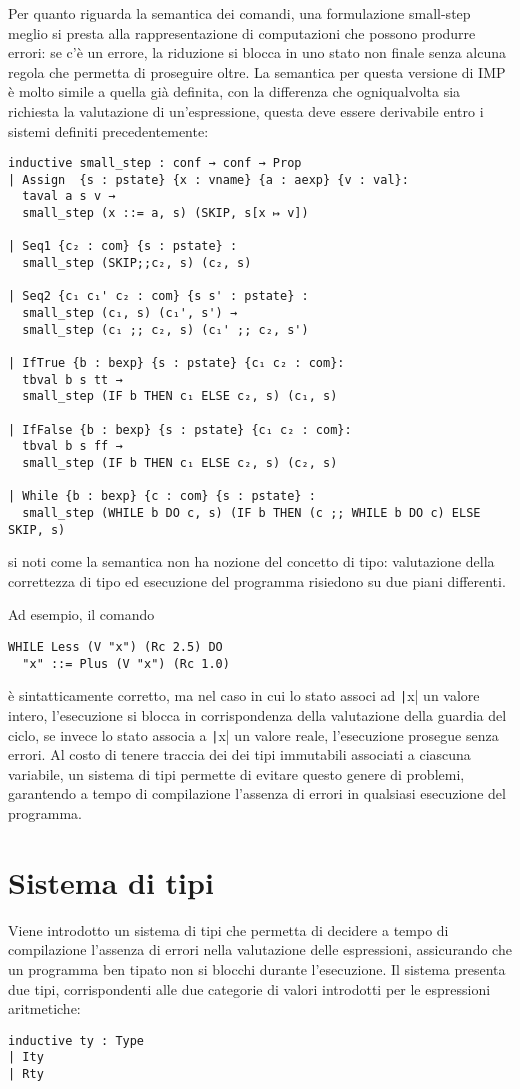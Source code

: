 Per quanto riguarda la semantica dei comandi, una formulazione small-step meglio si presta alla rappresentazione di computazioni che possono produrre errori: se c'è un errore, la riduzione si blocca in uno stato non finale senza alcuna regola che permetta di proseguire oltre. La semantica per questa versione di IMP è molto simile a quella già definita, con la differenza che ogniqualvolta sia richiesta la valutazione di un'espressione, questa deve essere derivabile entro i sistemi definiti precedentemente:
\begin{verbatim}
inductive small_step : conf → conf → Prop
| Assign  {s : pstate} {x : vname} {a : aexp} {v : val}:
  taval a s v →
  small_step (x ::= a, s) (SKIP, s[x ↦ v])

| Seq1 {c₂ : com} {s : pstate} :
  small_step (SKIP;;c₂, s) (c₂, s)

| Seq2 {c₁ c₁' c₂ : com} {s s' : pstate} :
  small_step (c₁, s) (c₁', s') →
  small_step (c₁ ;; c₂, s) (c₁' ;; c₂, s')

| IfTrue {b : bexp} {s : pstate} {c₁ c₂ : com}:
  tbval b s tt →
  small_step (IF b THEN c₁ ELSE c₂, s) (c₁, s)

| IfFalse {b : bexp} {s : pstate} {c₁ c₂ : com}:
  tbval b s ff →
  small_step (IF b THEN c₁ ELSE c₂, s) (c₂, s)

| While {b : bexp} {c : com} {s : pstate} :
  small_step (WHILE b DO c, s) (IF b THEN (c ;; WHILE b DO c) ELSE SKIP, s)
\end{verbatim}
si noti come la semantica non ha nozione del concetto di tipo: valutazione della correttezza di tipo ed esecuzione del programma risiedono su due piani differenti.

Ad esempio, il comando
\begin{verbatim}
WHILE Less (V "x") (Rc 2.5) DO 
  "x" ::= Plus (V "x") (Rc 1.0)
\end{verbatim}
è sintatticamente corretto, ma nel caso in cui lo stato associ ad \texttt|x| un valore intero, l'esecuzione si blocca in corrispondenza della valutazione della guardia del ciclo, se invece lo stato associa a \texttt|x| un valore reale, l'esecuzione prosegue senza errori. Al costo di tenere traccia dei dei tipi immutabili associati a ciascuna variabile, un sistema di tipi permette di evitare questo genere di problemi, garantendo a tempo di compilazione l'assenza di errori in qualsiasi esecuzione del programma.

\section{Sistema di tipi}
Viene introdotto un sistema di tipi che permetta di decidere a tempo di compilazione l'assenza di errori nella valutazione delle espressioni, assicurando che un programma ben tipato non si blocchi durante l'esecuzione. Il sistema presenta due tipi, corrispondenti alle due categorie di valori introdotti per le espressioni aritmetiche:
\begin{verbatim}
inductive ty : Type
| Ity
| Rty
\end{verbatim}

